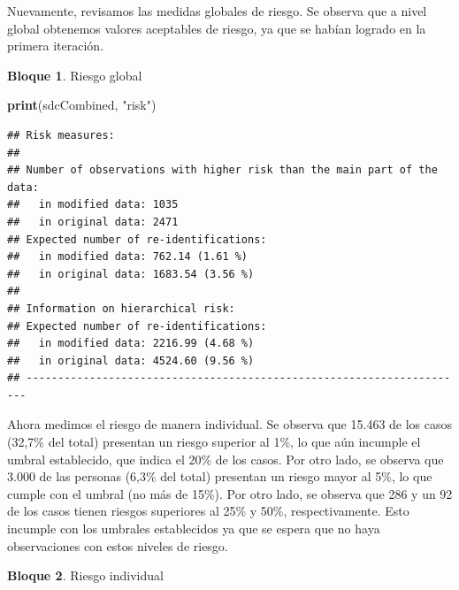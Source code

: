 \documentclass[]{book}
\newenvironment{Shaded}{\begin{snugshade}}{\end{snugshade}}
\newcommand{\CommentTok}[1]{\textcolor[rgb]{0.56,0.35,0.01}{\textit{#1}}}
\newcommand{\FloatTok}[1]{\textcolor[rgb]{0.00,0.00,0.81}{#1}}
\newcommand{\KeywordTok}[1]{\textcolor[rgb]{0.13,0.29,0.53}{\textbf{#1}}}
\newcommand{\NormalTok}[1]{#1}
\newcommand{\OperatorTok}[1]{\textcolor[rgb]{0.81,0.36,0.00}{\textbf{#1}}}
\newcommand{\StringTok}[1]{\textcolor[rgb]{0.31,0.60,0.02}{#1}}
\theoremstyle{definition}
\theoremstyle{definition}
\newtheorem{example}{Bloque}[chapter]
\theoremstyle{definition}
\theoremstyle{definition}
\theoremstyle{remark}
\begin{document}
Nuevamente, revisamos las medidas globales de riesgo. Se observa que a nivel global obtenemos valores aceptables de riesgo, ya que se habían logrado en la primera iteración.

\begin{example}
\protect\hypertarget{exm:bloque60nbm}{}{\label{exm:bloque60nbm} }Riesgo global
\end{example}

\begin{Shaded}
\begin{Highlighting}[]
\KeywordTok{print}\NormalTok{(sdcCombined, }\StringTok{"risk"}\NormalTok{)}
\end{Highlighting}
\end{Shaded}

\begin{verbatim}
## Risk measures:
## 
## Number of observations with higher risk than the main part of the data: 
##   in modified data: 1035
##   in original data: 2471
## Expected number of re-identifications: 
##   in modified data: 762.14 (1.61 %)
##   in original data: 1683.54 (3.56 %)
## 
## Information on hierarchical risk:
## Expected number of re-identifications: 
##   in modified data: 2216.99 (4.68 %)
##   in original data: 4524.60 (9.56 %)
## ----------------------------------------------------------------------
\end{verbatim}

Ahora medimos el riesgo de manera individual. Se observa que 15.463 de los casos (32,7\% del total) presentan un riesgo superior al 1\%, lo que aún incumple el umbral establecido, que indica el 20\% de los casos. Por otro lado, se observa que 3.000 de las personas (6,3\% del total) presentan un riesgo mayor al 5\%, lo que cumple con el umbral (no más de 15\%). Por otro lado, se observa que 286 y un 92 de los casos tienen riesgos superiores al 25\% y 50\%, respectivamente. Esto incumple con los umbrales establecidos ya que se espera que no haya observaciones con estos niveles de riesgo.

\begin{example}
\protect\hypertarget{exm:bloque61nbm}{}{\label{exm:bloque61nbm} }Riesgo individual
\end{example}

\begin{Shaded}
\end{Shaded}
\end{document}
